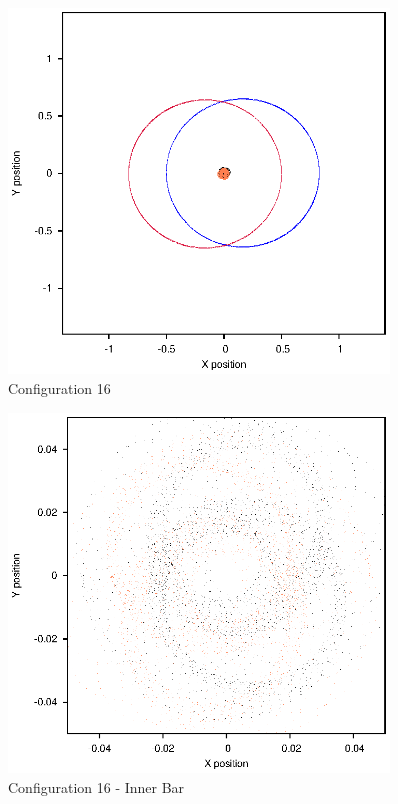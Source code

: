 \documentclass[a4paper,12pt]{article}
\begin{document}
\begin{figure}[H]
\centering
\includegraphics[width=0.9\textwidth]{./2017results/05-75-045-4/Orbit.eps}
\caption{Configuration 16}
\label{fig:config16}
\end{figure}
\begin{figure}[H]
\centering
\includegraphics[width=0.9\textwidth]{./2017results/05-75-045-4/Inner.eps}
\caption{Configuration 16 - Inner Bar}
\label{fig:config16i}
\end{figure}
\end{document}
